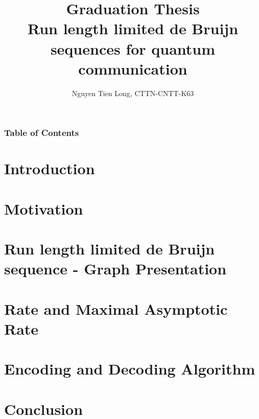 \documentclass{beamer}
\title[]{{\huge \bf Graduation Thesis} \\
\large Run length limited de Bruijn sequences for quantum communication}
\author[Nguyen Tien Long]{
Nguyen Tien Long, CTTN-CNTT-K63%
}
\institute[]{
Computer Science Department\\
School of Information and Communication Technology.
}
\begin{document}
\begin{frame}
    \titlepage
\end{frame}

\begin{frame}
    \frametitle{Table of Contents}
    \tableofcontents
\end{frame}

\section{Introduction}


\section{Motivation}


\section{Run length limited de Bruijn sequence - Graph Presentation}


\section{Rate and Maximal Asymptotic Rate}

\section{Encoding and Decoding Algorithm}


\section{Conclusion}



\end{document}

